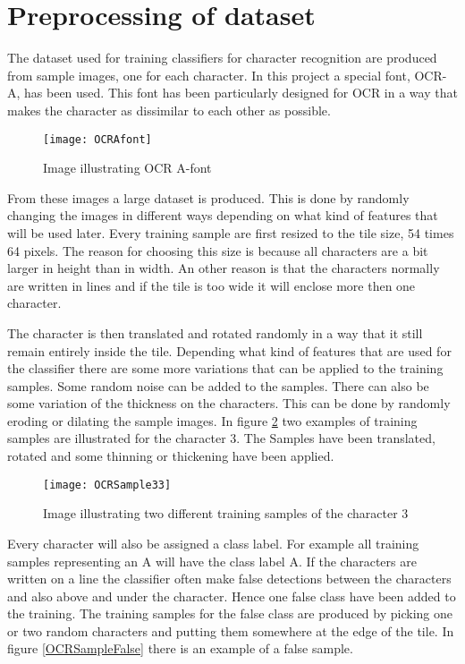 \section{Preprocessing of dataset}
\label{sec:Preprocessing of dataset}
The dataset used for training classifiers for character recognition are produced from sample images, one for each character. In this project a special font, OCR-A, has been used. This font has been particularly designed for OCR in a way that makes the character as dissimilar to each other as possible.

\begin{figure}[H]
\centering
	\texttt{[image: OCRAfont]}
	\caption{Image illustrating OCR A-font}
	\label{Afont}
\end{figure}

From these images a large dataset is produced. This is done by randomly changing the images in different ways depending on what kind of features that will be used later. Every training sample are first resized to the tile size, 54 times 64 pixels. The reason for choosing this size is because all characters are a bit larger in height than in width. An other reason is that the characters normally are written in lines and if the tile is too wide it will enclose more then one character. 

The character is then translated  and rotated randomly  in a way that it still remain entirely inside the tile. Depending what kind of features that are used for the classifier there are some more variations that can be applied to the training samples. Some random noise can be added to the samples. There can also be some variation of the thickness on the characters. This can be done by randomly eroding or dilating the sample images. In figure \ref{OCRSample3} two examples of training samples are illustrated for the character 3. The Samples have been translated, rotated and some thinning or thickening have been applied.

\begin{figure}[H]
\centering
	\texttt{[image: OCRSample33]}
	\caption{Image illustrating two different training samples of the character 3}
	\label{OCRSample3}
\end{figure}

Every character will also be assigned a class label. For example all training samples representing an A will have the class label A. If the characters are written on a line the classifier often make false detections between the characters and also above and under the character. Hence one false class have been added to the training. The training samples for the false class are produced by picking one or two random characters and putting them somewhere at the edge of the tile. In figure \ref{OCRSampleFalse} there is an example of a false sample.


